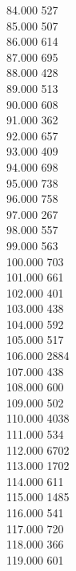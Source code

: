 { 84.000	527 \\
 85.000	507 \\
 86.000	614 \\
 87.000	695 \\
 88.000	428 \\
 89.000	513 \\
 90.000	608 \\
 91.000	362 \\
 92.000	657 \\
 93.000	409 \\
 94.000	698 \\
 95.000	738 \\
 96.000	758 \\
 97.000	267 \\
 98.000	557 \\
 99.000	563 \\
 100.000	703 \\
 101.000	661 \\
 102.000	401 \\
 103.000	438 \\
 104.000	592 \\
 105.000	517 \\
 106.000	2884 \\
 107.000	438 \\
 108.000	600 \\
 109.000	502 \\
 110.000	4038 \\
 111.000	534 \\
 112.000	6702 \\
 113.000	1702 \\
 114.000	611 \\
 115.000	1485 \\
 116.000	541 \\
 117.000	720 \\
 118.000	366 \\
 119.000	601 \\
}
